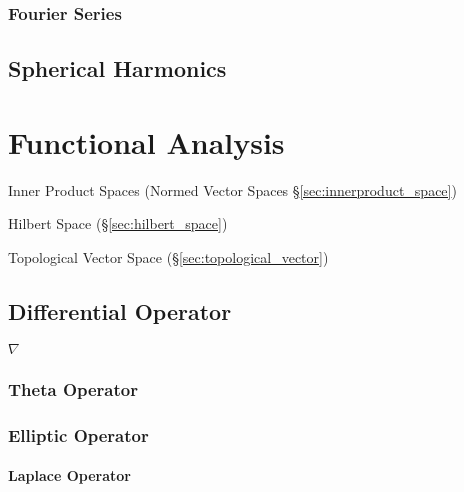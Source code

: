 \subsubsection{Fourier Series}\label{sec:fourier_series}



\subsection{Spherical Harmonics}\label{sec:spherical_harmonics}



\section{Functional Analysis}\label{sec:functional_analysis}

Inner Product Spaces (Normed Vector Spaces
\S\ref{sec:innerproduct_space})

Hilbert Space (\S\ref{sec:hilbert_space})

Topological Vector Space (\S\ref{sec:topological_vector})



\subsection{Differential Operator}\label{sec:differential_operator}


$\nabla$



\subsubsection{Theta Operator}\label{sec:theta_operator}

\subsubsection{Elliptic Operator}\label{sec:elliptic_operator}

\paragraph{Laplace Operator}\label{sec:laplace_operator}\hfill

